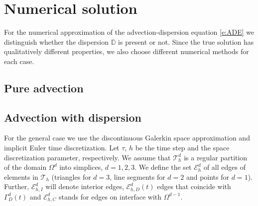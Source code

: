 \documentclass[a4paper]{article}
\def\D{{\tn D}}
\def\Eh{\mathcal E_h}       %
\def\Ehcom{\mathcal E_{h,C}}         %
\def\Ehdir{\mathcal E_{h,D}}         %
\def\Ehint{\mathcal E_{h,I}}       %
\def\Th{\mathcal T_h}       %
\def\tn#1{{\mathbb{#1}}}    %
\begin{document}
\section{Numerical solution}

For the numerical approximation of the advection-dispersion equation \eqref{e:ADE} we distinguish whether the dispersion $\D$ is present or not.
Since the true solution has qualitatively different properties, we also choose different numerical methods for each case.

\subsection{Pure advection}

\subsection{Advection with dispersion}

For the general case we use the discontinuous Galerkin space approximation and implicit Euler time discretization.
Let $\tau$, $h$ be the time step and the space discretization parameter, respectively.
We assume that $\Th^d$ is a regular partition of the domain $\Omega^d$ into simplices, $d=1,2,3$.
We define the set $\Eh^d$ of all edges of elements in $\Th$ (triangles for $d=3$, line segments for $d=2$ and points for $d=1$).
Further, $\Ehint^d$ will denote interior edges, $\Ehdir^d(t)$ edges that coincide with $\Gamma_D^d(t)$ and $\Ehcom^d$ stands for edges on interface with $\Omega^{d-1}$.
\end{document}
